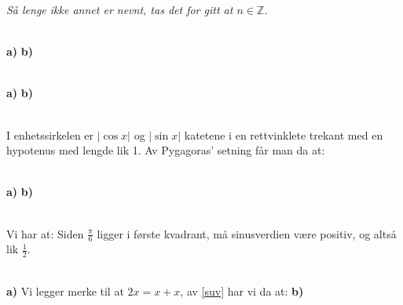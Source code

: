 





\textit{Så lenge ikke annet er nevnt, tas det for gitt at $ n\in \mathbb{Z} $.} \vsk

\\
\textbf{a)}
\textbf{b)}

\\
\textbf{a)}
\textbf{b)}

\\
I enhetssirkelen er $ |\cos x| $ og $ |\sin x| $ katetene i en rettvinklete trekant med en hypotenus med lengde lik 1. Av Pygagoras' setning får man da at:

\\
\textbf{a)} 
\newpage
\textbf{b)} 


\\
Vi har at:
Siden $ \frac{\pi}{6} $ ligger i første kvadrant, må sinusverdien være positiv, og altså lik $ \frac{1}{2} $.\vsk

\\
\textbf{a)} Vi legger merke til at $ {2x=x+x} $, av \eqref{suv} har vi da at:
\textbf{b)} 

